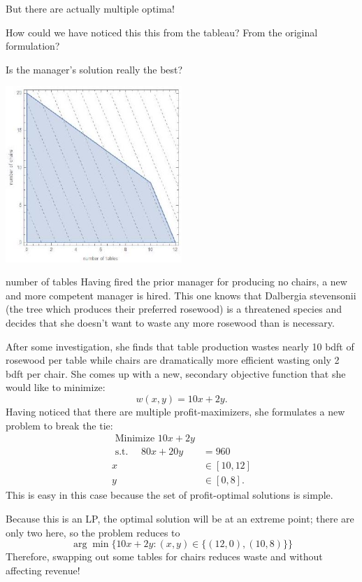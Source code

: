 But there are actually multiple optima!

How could we have noticed this this from the tableau? From the original formulation?

Is the manager's solution really the best?

\includegraphics[width=0.5\textwidth]{optimization/multi-objective/images/2022_02_28_634e8079070800ac7e3cg-05}

number of tables Having fired the prior manager for producing no chairs, a new and more competent manager is hired. This one knows that Dalbergia stevensonii (the tree which produces their preferred rosewood) is a threatened species and decides that she doesn't want to waste any more rosewood than is necessary.

After some investigation, she finds that table production wastes nearly 10 bdft of rosewood per table while chairs are dramatically more efficient wasting only 2 bdft per chair. She comes up with a new, secondary objective function that she would like to minimize:
$$
w(x, y)=10 x+2 y .
$$
Having noticed that there are multiple profit-maximizers, she formulates a new problem to break the tie:
$$
\begin{aligned}
\text { Minimize } 10 x+2 y & \\
\text { s.t. } \quad 80 x+20 y &=960 \\
x & \in[10,12] \\
y & \in[0,8] .
\end{aligned}
$$
This is easy in this case because the set of profit-optimal solutions is simple.

Because this is an LP, the optimal solution will be at an extreme point; there are only two here, so the problem reduces to
$$
\arg \min \{10 x+2 y:(x, y) \in\{(12,0),(10,8)\}\}
$$
Therefore, swapping out some tables for chairs reduces waste and without affecting revenue!

